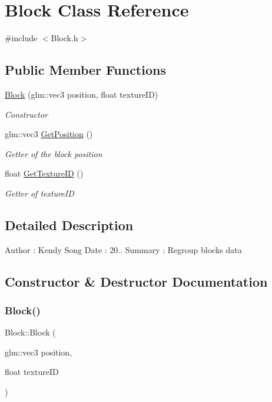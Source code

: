 \hypertarget{class_block}{}\section{Block Class Reference}
\label{class_block}


{\ttfamily \#include $<$Block.\+h$>$}

\subsection*{Public Member Functions}
\begin{DoxyCompactItemize}
\item 
\mbox{\hyperlink{class_block_a7897e23cb33c0285eb5bb64c4f825618}{Block}} (glm\+::vec3 position, float texture\+ID)
\begin{DoxyCompactList}\small\item\em Constructor \end{DoxyCompactList}\item 
glm\+::vec3 \mbox{\hyperlink{class_block_aa35387c6d2b82e94188fa76559ac4d78}{Get\+Position}} ()
\begin{DoxyCompactList}\small\item\em Getter of the block position \end{DoxyCompactList}\item 
float \mbox{\hyperlink{class_block_af44cfa5e8853286c3f014e97eaabbaa4}{Get\+Texture\+ID}} ()
\begin{DoxyCompactList}\small\item\em Getter of texture\+ID \end{DoxyCompactList}\end{DoxyCompactItemize}


\subsection{Detailed Description}
Author \+: Kendy Song Date \+: 20.. Summary \+: Regroup block\textquotesingle{}s data 

\subsection{Constructor \& Destructor Documentation}
\mbox{\label{class_block_a7897e23cb33c0285eb5bb64c4f825618}} 
\subsubsection{\texorpdfstring{Block()}{Block()}}
{\footnotesize\ttfamily Block\+::\+Block (\begin{DoxyParamCaption}\item[{glm\+::vec3}]{position,  }\item[{float}]{texture\+ID }\end{DoxyParamCaption})}



